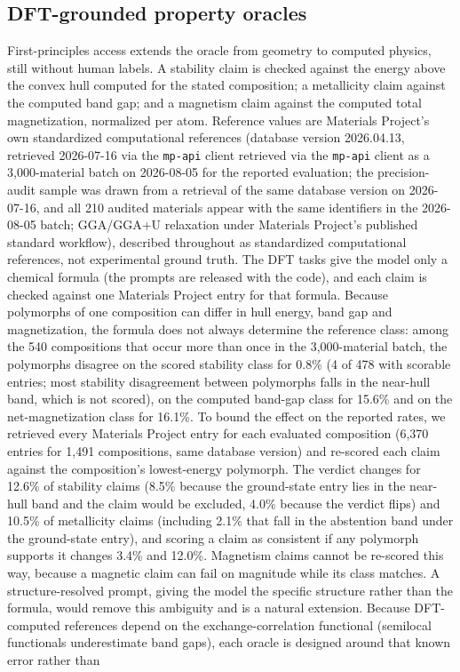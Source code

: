 \documentclass[pdflatex,sn-nature]{sn-jnl}
\newcommand{\rev}[1]{#1} %
\newcommand{\rev}[1]{{\color{blue}#1}} %
\providecommand{\DIFadd}[1]{{\protect\color{blue} \sf #1}} %
\providecommand{\DIFdel}[1]{{\protect\color{red} \scriptsize #1}} %
\providecommand{\DIFaddbegin}{} %
\providecommand{\DIFaddend}{} %
\providecommand{\DIFdelbegin}{} %
\providecommand{\DIFdelend}{} %
\providecommand{\DIFscaledelfig}{0.5}
\newlength{\DIFdelgraphicswidth} %
\newlength{\DIFdelgraphicsheight} %
\providecommand{\DIFaddincludegraphics}[2][]{{\color{blue}\fbox{\DIFOincludegraphics[#1]{#2}}}} %
\providecommand{\DIFdelincludegraphics}[2][]{%
\sbox{\DIFdelgraphicsbox}{\DIFOincludegraphics[#1]{#2}}%
\settoboxwidth{\DIFdelgraphicswidth}{\DIFdelgraphicsbox} %
\settoboxtotalheight{\DIFdelgraphicsheight}{\DIFdelgraphicsbox} %
\scalebox{\DIFscaledelfig}{%
\parbox[b]{\DIFdelgraphicswidth}{\usebox{\DIFdelgraphicsbox}\\[-\baselineskip] \rule{\DIFdelgraphicswidth}{0em}}\llap{\resizebox{\DIFdelgraphicswidth}{\DIFdelgraphicsheight}{%
\setlength{\unitlength}{\DIFdelgraphicswidth}%
\begin{picture}(1,1)%
\thicklines\linethickness{2pt} %
{\color[rgb]{1,0,0}\put(0,0){\framebox(1,1){}}}%
{\color[rgb]{1,0,0}\put(0,0){\line( 1,1){1}}}%
{\color[rgb]{1,0,0}\put(0,1){\line(1,-1){1}}}%
\end{picture}%
}\hspace*{3pt}}} %
} %
\DeclareRobustCommand{\DIFaddbegin}{\DIFOaddbegin \let\includegraphics\DIFaddincludegraphics} %
\DeclareRobustCommand{\DIFaddend}{\DIFOaddend \let\includegraphics\DIFOincludegraphics} %
\DeclareRobustCommand{\DIFdelbegin}{\DIFOdelbegin \let\includegraphics\DIFdelincludegraphics} %
\DeclareRobustCommand{\DIFdelend}{\DIFOaddend \let\includegraphics\DIFOincludegraphics} %
\begin{document}
\DIFaddend \subsection*{DFT-grounded property oracles}
First-principles access extends the oracle from geometry to computed physics, still
without human labels. A stability claim is checked against the energy above the
convex hull computed for the stated composition; a metallicity claim against the
computed band gap; and a magnetism claim against the computed total magnetization,
normalized per atom. Reference values are Materials Project's own standardized
computational references (database version 2026.04.13, \DIFdelbegin \DIFdel{retrieved 2026-07-16 via the
\texttt{mp-api} client}\DIFdelend \DIFaddbegin \DIFadd{\rev{retrieved via the
\texttt{mp-api} client as a 3{,}000-material batch on 2026-08-05 for the reported evaluation; the
precision-audit sample was drawn from a retrieval of the same database version on 2026-07-16, and all
210 audited materials appear with the same identifiers in the 2026-08-05 batch}}\DIFaddend ; GGA/GGA+U relaxation under Materials Project's published standard workflow), described throughout as standardized computational references, not experimental ground truth. \DIFaddbegin \DIFadd{\rev{The DFT tasks give the model only a
chemical formula (the prompts are released with the code), and each claim is checked against one
Materials Project entry for that formula. Because polymorphs of one composition can differ in hull
energy, band gap and magnetization, the formula does not always determine the reference class: among
the 540 compositions that occur more than once in the 3{,}000-material batch, the polymorphs disagree
on the scored stability class for 0.8\% (4 of 478 with scorable entries; most stability disagreement
between polymorphs falls in the near-hull band, which is not scored), on the computed band-gap class for
15.6\% and on the net-magnetization class for 16.1\%. To bound the effect on the reported rates, we retrieved every Materials Project
entry for each evaluated composition (6{,}370 entries for 1{,}491 compositions, same database version)
and re-scored each claim against the composition's lowest-energy polymorph. The verdict changes for
12.6\% of stability claims (8.5\% because the ground-state entry lies in the near-hull band and the claim
would be excluded, 4.0\% because the verdict flips) and 10.5\% of metallicity claims (including 2.1\% that
fall in the abstention band under the ground-state entry), and scoring a claim as consistent if any
polymorph supports it changes 3.4\% and 12.0\%. Magnetism claims cannot be re-scored this way, because a
magnetic claim can fail on magnitude while its class matches. A structure-resolved prompt, giving the
model the specific structure rather than the formula, would remove this ambiguity and is a natural
extension.} }\DIFaddend Because DFT-computed references depend on the exchange-correlation functional (semilocal functionals underestimate band gaps), each oracle is designed around that known error rather than
\end{document}
